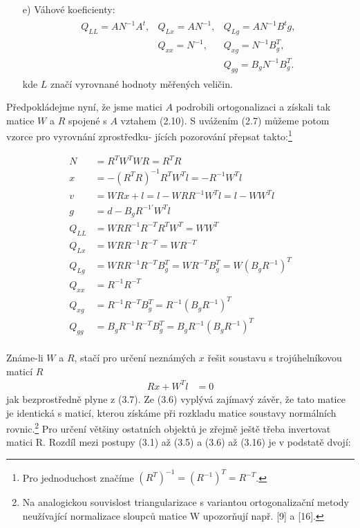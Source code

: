 \begin{itemize}
\item[e)] Váhové koeficienty:
%
\begin{align*}
\begin{array}{lll}
\tag{3.5}
Q_{LL} = AN^{-1}A^t,   &   Q_{Lx} = AN^{-1},   &  Q_{Lg} = AN^{-1}B^tg,\\
                     &   Q_{xx} = N^{-1},    &  Q_{xg} = N^{-1}B^T_g,\\
                     &                      &  Q_{gg} = B_gN^{-1}B^T_g.
\end{array}
\end{align*}
kde $L$ značí vyrovnané hodnoty měřených veličin.

\end{itemize}


Předpokládejme nyní, že jsme matici $A$ podrobili ortogonalizaci a
získali tak matice $W$ a $R$ spojené s $A$ vztahem (2.10). S uvážením
(2.7) můžeme potom vzorce pro vyrovnání zprostředku- jících pozorování
přepsat takto:\footnote{Pro jednoduchost značíme
$(R^T)^{-1} = (R^{-1})^T = R^{-T}$.}

\begin{align*}
\tag{3.6}     N &= R^TW^TWR = R^TR\\
\tag{3.7}     x &= -(R^TR)^{-1}R^TW^Tl = -R^{-1}W^Tl\\
\tag{3.8}     v &= WRx + l = l - WRR^{-1}W^Tl = l - WW^Tl\\[1.5ex]
\tag{3.9}     g &= d - B_gR^{-1'}W^Tl\\[1.5ex]
\tag{3.10}    Q_{LL} &= WRR^{-1}R^{-T}R^TW^T = WW^T\\
\tag{3.11}    Q_{Lx} &= WRR^{-1}R^{-T} = WR^{-T}\\
\tag{3.12}    Q_{Lg} &= WRR^{-1}R^{-T}B_g^T = WR^{-T}B_g^T = W(B_gR^{-1})^T\\
\tag{3.13}    Q_{xx} &= R^{-1}R^{-T}\\
\tag{3.14}    Q_{xg} &= R^{-1}R^{-T}B_g^T = R^{-1}(B_gR^{-1})^T\\
\tag{3.15}    Q_{gg} &= B_gR^{-1}R^{-T}B_g^T = B_gR^{-1}(B_gR^{-1})^T\\
\end{align*}



Známe-li $W$ a $R$, stačí pro určení neznámých $x$ řešit
soustavu s trojúhelníkovou maticí $R$
%
\begin{align*}
\tag{3.16}    Rx + W^Tl &= 0
\end{align*}
%
\noindent jak bezprostředně plyne z (3.7). Ze (3.6) vyplývá zajímavý
závěr, že tato matice je identická s maticí, kterou získáme při
 rozkladu matice soustavy normálních
rovnic.\footnote{Na analogickou souvislost  triangularizace s variantou
ortogonalizační metody neužívající nor\-ma\-li\-za\-ce sloupců matice
W upozorňují např.  [9] a  [16].}
%
Pro určení většiny ostatních objektů je zřejmě ještě třeba invertovat
matici R. Rozdíl mezi postupy (3.1) až (3.5) a (3.6) až (3.16) je v
podstatě dvojí:


